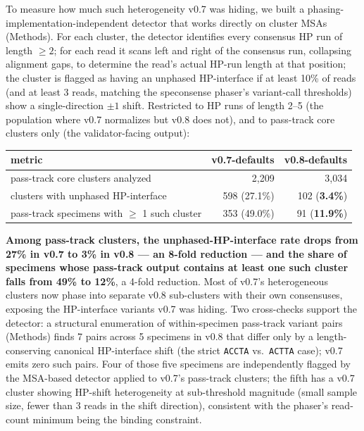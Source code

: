 \documentclass[11pt]{article}
\begin{document}
To measure how much such heterogeneity v0.7 was hiding, we built a
phasing-implementation-independent detector that works directly on
cluster MSAs (Methods). For each cluster, the detector identifies every
consensus HP run of length $\geq 2$; for each read it scans left and
right of the consensus run, collapsing alignment gaps, to determine the
read's actual HP-run length at that position; the cluster is flagged
as having an unphased HP-interface if at least 10\% of reads (and at
least 3 reads, matching the speconsense phaser's variant-call
thresholds) show a single-direction $\pm 1$ shift. Restricted to HP
runs of length 2--5 (the population where v0.7 normalizes but v0.8
does not), and to pass-track core clusters only (the validator-facing
output):

\begin{center}
\begin{tabular}{lrr}
\toprule
metric & v0.7-defaults & v0.8-defaults \\
\midrule
pass-track core clusters analyzed & 2,209 & 3,034 \\
clusters with unphased HP-interface & 598 (27.1\%) & 102 (\textbf{3.4\%}) \\
pass-track specimens with $\geq$ 1 such cluster & 353 (49.0\%) & 91 (\textbf{11.9\%}) \\
\bottomrule
\end{tabular}
\end{center}

\textbf{Among pass-track clusters, the unphased-HP-interface rate drops
from 27\% in v0.7 to 3\% in v0.8 --- an 8-fold reduction --- and the
share of specimens whose pass-track output contains at least one such
cluster falls from 49\% to 12\%}, a 4-fold reduction. Most of v0.7's
heterogeneous clusters now phase into separate v0.8 sub-clusters with
their own consensuses, exposing the HP-interface variants v0.7 was
hiding. Two cross-checks support the detector: a structural enumeration
of within-specimen pass-track variant pairs (Methods) finds 7 pairs
across 5 specimens in v0.8 that differ only by a length-conserving
canonical HP-interface shift (the strict \texttt{ACCTA}
vs.~\texttt{ACTTA} case); v0.7 emits zero such pairs. Four of those
five specimens are independently flagged by the MSA-based detector
applied to v0.7's pass-track clusters; the fifth has a v0.7 cluster
showing HP-shift heterogeneity at sub-threshold magnitude (small
sample size, fewer than 3 reads in the shift direction), consistent
with the phaser's read-count minimum being the binding constraint.
\end{document}

